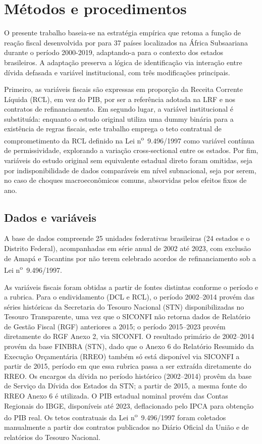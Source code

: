 \chapter{Métodos e procedimentos}
\label{chap:metodologia}

O presente trabalho baseia-se na estratégia empírica que retoma a função de reação fiscal desenvolvida por  para 37 países localizados na África Subsaariana durante o período 2000-2019, adaptando-a para o contexto dos estados brasileiros. A adaptação preserva a lógica de identificação via interação entre dívida defasada e variável institucional, com três modificações principais.

Primeiro, as variáveis fiscais são expressas em proporção da Receita Corrente Líquida (RCL), em vez do PIB, por ser a referência adotada na LRF e nos contratos de refinanciamento. Em segundo lugar, a variável institucional é substituída: enquanto o estudo original utiliza uma dummy binária para a existência de regras fiscais, este trabalho emprega o teto contratual de comprometimento da RCL definido na Lei n\textsuperscript{o}~9.496/1997 como variável contínua de permissividade, explorando a variação cross-sectional entre os estados. Por fim, variáveis do estudo original sem equivalente estadual direto foram omitidas, seja por indisponibilidade de dados comparáveis em nível subnacional, seja por serem, no caso de choques macroeconômicos comuns, absorvidas pelos efeitos fixos de ano.

\section{Dados e variáveis}
\label{sec:dados}

A base de dados compreende 25 unidades federativas brasileiras (24 estados e o Distrito Federal), acompanhadas em série anual de 2002 até 2023, com exclusão de Amapá e Tocantins por não terem celebrado acordos de refinanciamento sob a Lei n\textsuperscript{o}~9.496/1997.

As variáveis fiscais foram obtidas a partir de fontes distintas conforme o período e a rubrica. Para o endividamento (DCL e RCL), o período 2002--2014 provém das séries históricas da Secretaria do Tesouro Nacional (STN) disponibilizadas no Tesouro Transparente, uma vez que o SICONFI não retorna dados de Relatório de Gestão Fiscal (RGF) anteriores a 2015; o período 2015--2023 provém diretamente do RGF Anexo 2, via SICONFI. O resultado primário de 2002--2014 provém da base FINBRA (STN), dado que o Anexo 6 do Relatório Resumido da Execução Orçamentária (RREO) também só está disponível via SICONFI a partir de 2015, período em que essa rubrica passa a ser extraída diretamente do RREO. Os encargos da dívida no período histórico (2002--2014) provêm da base de Serviço da Dívida dos Estados da STN; a partir de 2015, a mesma fonte do RREO Anexo 6 é utilizada. O PIB estadual nominal provém das Contas Regionais do IBGE, disponíveis até 2023, deflacionado pelo IPCA para obtenção do PIB real. Os tetos contratuais da Lei n\textsuperscript{o}~9.496/1997 foram coletados manualmente a partir dos contratos publicados no Diário Oficial da União e de relatórios do Tesouro Nacional.

